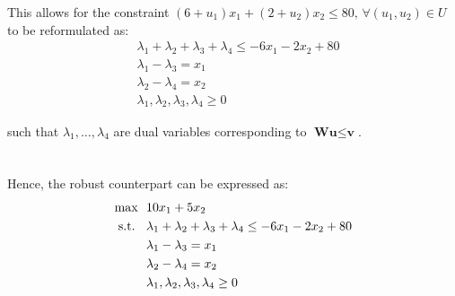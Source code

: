 \documentclass{article}
\begin{document}
This allows for the constraint $(6 + u_1) x_1 + (2 + u_2) x_2 \leq 80, \, \forall (u_1, u_2) \in U$ to be reformulated as:
\begin{equation}
\begin{split}
    & \lambda_1 + \lambda_2 + \lambda_3 + \lambda_4 \leq -6x_1 - 2x_2 + 80\\
    & \lambda_1 - \lambda_3 = x_1\\
    & \lambda_2 - \lambda_4 = x_2\\
    & \lambda_1, \lambda_2, \lambda_3, \lambda_4 \geq 0
\end{split} 
\end{equation}

such that $\lambda_1,\ldots, \lambda_4$ are dual variables corresponding to $\textbf{Wu} \leq \textbf{v}$.\\

\\~\\
Hence, the robust counterpart can be expressed as:
\begin{equation}
\begin{split}
    \text{max \space} 
    & 10x_1 + 5x_2\\
    \text{s.t. \space} 
    & \lambda_1 + \lambda_2 + \lambda_3 + \lambda_4 \leq -6x_1 - 2x_2 + 80\\
    & \lambda_1 - \lambda_3 = x_1\\
    & \lambda_2 - \lambda_4 = x_2\\
    & \lambda_1, \lambda_2, \lambda_3, \lambda_4 \geq 0
\end{split}
\end{equation}

\end{document}
